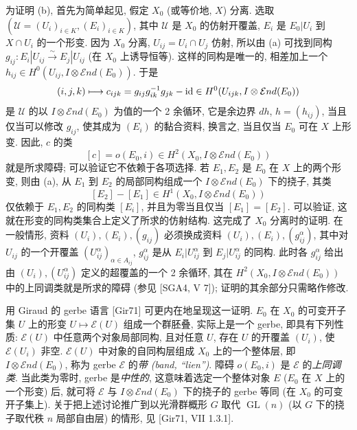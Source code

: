 为证明 (b), 首先为简单起见, 假定 $X_0$ (或等价地, $X$) 分离. 选取 $(\mathcal U=(U_i)_{i\in K},(E_i)_{i\in K})$, 其中 $\mathcal U$ 是 $X_0$ 的仿射开覆盖, $E_i$ 是 $E_0|U_i$ 到 $X\cap U_i$ 的一个形变. 因为 $X_0$ 分离, $U_{ij}=U_i\cap U_j$ 仿射, 所以由 (a) 可找到同构 $g_{ij}:E_i|U_{ij}\xrightarrow\sim E_j|U_{ij}$ (在 $X_0$ 上诱导恒等). 这样的同构是唯一的, 相差加上一个 $h_{ij}\in H^0(U_{ij},I\otimes\mathcal End(E_0))$. 于是
\[(i,j,k)\longmapsto c_{ijk}=g_{ij}g_{ik}^{-1}g_{jk}-\mathrm{id}\in H^0(U_{ijk},I\otimes\mathcal End(E_0))\]
是 $\mathcal U$ 的以 $I\otimes\mathcal End(E_0)$ 为值的一个 2 余循环, 它是余边界 $dh$, $h=(h_{ij})$, 当且仅当可以修改 $g_{ij}$, 使其成为 $(E_i)$ 的黏合资料, 换言之, 当且仅当 $E_0$ 可在 $X$ 上形变. 因此, $c$ 的类
\[[c]=o(E_0,i)\in H^2(X_0,I\otimes\mathcal End(E_0))\]
就是所求障碍; 可以验证它不依赖于各项选择. 若 $E_1,E_2$ 是 $E_0$ 在 $X$ 上的两个形变, 则由 (a), 从 $E_1$ 到 $E_2$ 的局部同构组成一个 $I\otimes\mathcal End(E_0)$ 下的挠子, 其类
\[[E_2]-[E_1]\in H^1(X_0,I\otimes\mathcal End(E_0))\]
仅依赖于 $E_1,E_2$ 的同构类 $[E_i]$, 并且为零当且仅当 $[E_1]=[E_2]$. 可以验证, 这就在形变的同构类集合上定义了所求的仿射结构. 这完成了 $X_0$ 分离时的证明. 在一般情形, 资料 $(U_i),(E_i),(g_{ij})$ 必须换成资料 $(U_i),(E_i),(g_{ij}^{\alpha})$, 其中对 $U_{ij}$ 的一个开覆盖 $(U_{ij}^{\alpha})_{\alpha\in A_{ij}}$, $g_{ij}^{\alpha}$ 是从 $E_i|U_{ij}^{\alpha}$ 到 $E_j|U_{ij}^{\alpha}$ 的同构. 此时各 $g_{ij}^{\alpha}$ 给出由 $(U_i),(U_{ij}^{\alpha})$ 定义的超覆盖的一个 2 余循环,
其在 $H^2(X_0,I\otimes\mathcal End(E_0))$ 中的上同调类就是所求的障碍 (参见 [SGA4, V 7]); 证明的其余部分只需略作修改.

用 Giraud 的 gerbe 语言 [Gir71] 可更内在地呈现这一证明. $E_0$ 在 $X_0$ 的可变开子集 $U$ 上的形变 $U\mapsto\mathcal E(U)$ 组成一个群胚叠, 实际上是一个 gerbe, 即具有下列性质: $\mathcal E(U)$ 中任意两个对象局部同构, 且对任意 $U$, 存在 $U$ 的开覆盖 $(U_i)$, 使 $\mathcal E(U_i)$ 非空. $\mathcal E(U)$ 中对象的自同构层组成 $X_0$ 上的一个整体层, 即 $I\otimes\mathcal End(E_0)$, 称为 gerbe $\mathcal E$ 的\emph{带 (band, ``lien'')}. 障碍 $o(E_0,i)$ 是 $\mathcal E$ 的\emph{上同调类}. 当此类为零时, gerbe 是\emph{中性的}, 这意味着选定一个整体对象 $E$ ($E_0$ 在 $X$ 上的一个形变) 后, 就可将 $\mathcal E$ 与 $I\otimes\mathcal End(E_0)$ 下的挠子的 gerbe 等同 (在 $X_0$ 的可变开子集上). 关于把上述讨论推广到以光滑群概形 $G$ 取代 $\operatorname{GL}(n)$ (以 $G$ 下的挠子取代秩 $n$ 局部自由层) 的情形, 见 [Gir71, VII 1.3.1].

